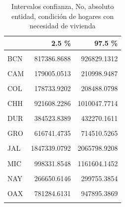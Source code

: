 \documentclass[
]{article}
\begin{document}
\begin{table}[H]

\caption{\label{tab:unnamed-chunk-20}Intervalos confianza, No, absoluto entidad, 
    condición de hogares con necesidad de vivienda}
\centering
\begin{tabular}[t]{lrr}
\toprule
  & 2.5 \% & 97.5 \%\\
\midrule
\cellcolor{gray!6}{AGU} & \cellcolor{gray!6}{318407.3661} & \cellcolor{gray!6}{351980.6339}\\
BCN & 817386.8688 & 926829.1312\\
\cellcolor{gray!6}{BCS} & \cellcolor{gray!6}{169906.4416} & \cellcolor{gray!6}{195187.5584}\\
CAM & 179005.0513 & 210998.9487\\
\cellcolor{gray!6}{COA} & \cellcolor{gray!6}{709317.1176} & \cellcolor{gray!6}{786258.8824}\\
\addlinespace
COL & 178733.9202 & 208488.0798\\
\cellcolor{gray!6}{CHP} & \cellcolor{gray!6}{956683.8114} & \cellcolor{gray!6}{1158290.1886}\\
CHH & 921608.2286 & 1010047.7714\\
\cellcolor{gray!6}{CMX} & \cellcolor{gray!6}{1951002.9563} & \cellcolor{gray!6}{2141337.0437}\\
DUR & 384523.8389 & 432270.1611\\
\addlinespace
\cellcolor{gray!6}{GUA} & \cellcolor{gray!6}{1250120.6920} & \cellcolor{gray!6}{1410177.3080}\\
GRO & 616741.4735 & 714510.5265\\
\cellcolor{gray!6}{HID} & \cellcolor{gray!6}{691833.1870} & \cellcolor{gray!6}{783792.8130}\\
JAL & 1847339.0792 & 2065798.9208\\
\cellcolor{gray!6}{MEX} & \cellcolor{gray!6}{3641871.4644} & \cellcolor{gray!6}{4178104.5356}\\
\addlinespace
MIC & 998331.8548 & 1161604.1452\\
\cellcolor{gray!6}{MOR} & \cellcolor{gray!6}{443720.4827} & \cellcolor{gray!6}{525287.5173}\\
NAY & 266650.6146 & 299755.3854\\
\cellcolor{gray!6}{NLE} & \cellcolor{gray!6}{1413158.6361} & \cellcolor{gray!6}{1593217.3639}\\
OAX & 781284.6131 & 947895.3869\\
\addlinespace
\cellcolor{gray!6}{PUE} & \cellcolor{gray!6}{1244277.3125} & \cellcolor{gray!6}{1458838.6875}\\

\end{tabular}
\end{table}
\end{document}
